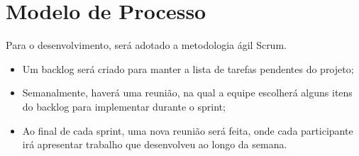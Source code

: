 \documentclass[11pt]{article}
\begin{document}


\section{Modelo de Processo}

Para o desenvolvimento, será adotado a metodologia ágil Scrum.

\begin{itemize}
	\item Um backlog será criado para manter a lista de tarefas pendentes do projeto;
	\item Semanalmente, haverá uma reunião, na qual a equipe escolherá alguns itens do backlog para implementar durante o sprint;
	\item Ao final de cada sprint, uma nova reunião será feita, onde cada participante irá apresentar trabalho que desenvolveu ao longo da semana.
\end{itemize}
\end{document}
